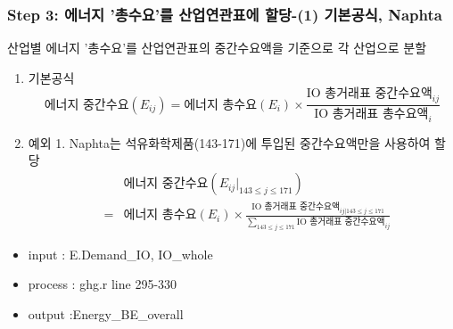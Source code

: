 \documentclass[10pt,compress,slidetop,%
			   hyperref={unicode},xcolor={svgnames},%
			   t]{beamer}
\begin{document}
\begin{frame}
	\frametitle{Step 3: 에너지 '총수요'를 산업연관표에 할당-(1) 기본공식, Naphta}
\bigskip
산업별 에너지 '총수요'를 산업연관표의 중간수요액을 기준으로 각 산업으로 분할
\smallskip
\begin{enumerate}
\item{기본공식}
\begin{displaymath}
			\mbox{에너지 중간수요} (E_{ij})=\mbox{에너지 총수요}(E_i)\times\frac{\mbox{IO 총거래표 중간수요액}_{ij}}{\mbox{IO 총거래표 총수요액}_i}
\end{displaymath}

\item{예외 1. Naphta는 석유화학제품(143-171)에 투입된 중간수요액만을 사용하여 할당}
\begin{eqnarray*}
			& &\mbox{에너지 중간수요} (E_{ij}|_{143\le j \le 171})\\
			&=&\mbox{에너지 총수요}(E_i)\times\frac{\mbox{IO 총거래표 중간수요액}_{ij|143\le j \le 171}}{\sum_{143\le j \le 171}\mbox{IO 총거래표 중간수요액}_{ij}}
\end{eqnarray*}

\end{enumerate}
\begin{itemize}
\item{input : E.Demand\_IO, IO\_whole}
\item{process : ghg.r line 295-330}
\item{output :Energy\_BE\_overall }
\end{itemize} 
		
\end{frame}
\end{document}
